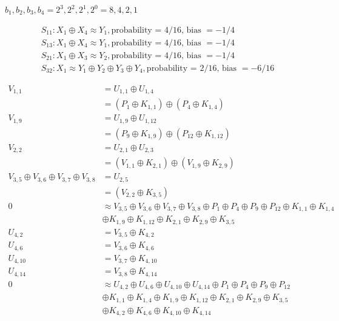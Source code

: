 \documentclass[11pt]{article}
\begin{document}
$b_1, b_2, b_3, b_4 = 2^3, 2^2, 2^1, 2^0 = 8, 4, 2, 1$

\begin{align*}
    S_{11} : X_{1} \oplus X_{4} \approx Y_{1}, \text{probability = $4/16$, bias $= -1/4$} \\
    S_{13} : X_{1} \oplus X_{4} \approx Y_{1}, \text{probability = $4/16$, bias $= -1/4$} \\
    S_{21} : X_{1} \oplus X_{3} \approx Y_{2}, \text{probability = $4/16$, bias $= -1/4$} \\
    S_{32} : X_{1} \approx Y_{1} \oplus Y_{2} \oplus Y_{3} \oplus Y_{4}, \text{probability = 2/16$$, bias $= -6/16$}
\end{align*}

\begin{align*}
    V_{1,1} &= U_{1,1} \oplus U_{1,4} \\
            &= (P_1 \oplus K_{1,1}) \oplus (P_4 \oplus K_{1,4}) \\
    V_{1,9} &= U_{1,9} \oplus U_{1,12} \\
            &= (P_9 \oplus K_{1,9}) \oplus (P_{12} \oplus K_{1,12}) \\
    V_{2,2} &= U_{2,1} \oplus U_{2,3} \\
            &= (V_{1,1} \oplus K_{2,1}) \oplus (V_{1,9} \oplus K_{2,9}) \\
    V_{3,5} \oplus V_{3,6} \oplus V_{3,7} \oplus V_{3,8} &= U_{2,5} \\
            &= (V_{2,2} \oplus K_{3,5}) \\
    0 &\approx V_{3,5} \oplus V_{3,6} \oplus V_{3,7} \oplus V_{3,8} \oplus P_1 \oplus P_4 \oplus P_9 \oplus P_{12} \oplus K_{1,1} \oplus K_{1,4} \\
    & \oplus K_{1,9} \oplus K_{1,12} \oplus K_{2,1} \oplus K_{2,9} \oplus K_{3,5} \\
    U_{4,2} &= V_{3,5} \oplus K_{4,2} \\
    U_{4,6} &= V_{3,6} \oplus K_{4,6} \\
    U_{4,10}&= V_{3,7} \oplus K_{4,10} \\
    U_{4,14}&= V_{3,8} \oplus K_{4,14} \\
    0 &\approx U_{4,2} \oplus U_{4,6} \oplus U_{4,10} \oplus U_{4,14} \oplus P_1 \oplus P_4 \oplus P_9 \oplus P_{12} \\
    &\oplus K_{1,1} \oplus K_{1,4} \oplus K_{1,9} \oplus K_{1,12} \oplus K_{2,1} \oplus K_{2,9} \oplus K_{3,5}\\
    &\oplus K_{4,2} \oplus K_{4,6} \oplus K_{4,10} \oplus K_{4,14}
\end{align*}
\end{document}
